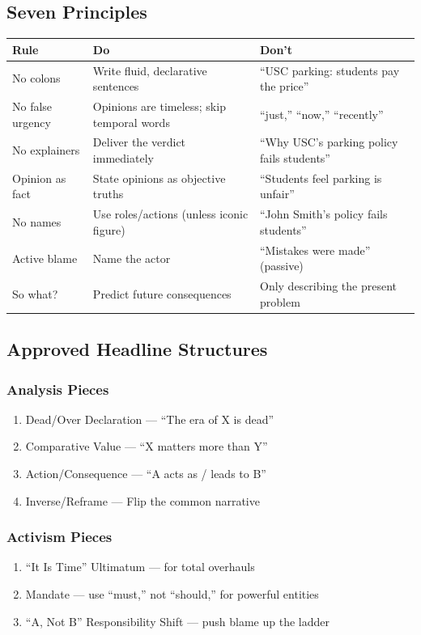 \documentclass[12pt]{article}
\newlength{\tblwidth}
\begin{document}
\subsection{Seven Principles}

\begin{longtable}{p{0.22\tblwidth} p{0.36\tblwidth} p{0.38\tblwidth}}
\toprule
\textbf{Rule} & \textbf{Do} & \textbf{Don't} \\
\midrule
No colons & Write fluid, declarative sentences & ``USC parking: students pay the price'' \\
No false urgency & Opinions are timeless; skip temporal words & ``just,'' ``now,'' ``recently'' \\
No explainers & Deliver the verdict immediately & ``Why USC's parking policy fails students'' \\
Opinion as fact & State opinions as objective truths & ``Students feel parking is unfair'' \\
No names & Use roles/actions (unless iconic figure) & ``John Smith's policy fails students'' \\
Active blame & Name the actor & ``Mistakes were made'' (passive) \\
So what? & Predict future consequences & Only describing the present problem \\
\bottomrule
\end{longtable}

\subsection{Approved Headline Structures}

\subsubsection{Analysis Pieces}
\begin{enumerate}
    \item Dead/Over Declaration --- ``The era of X is dead''
    \item Comparative Value --- ``X matters more than Y''
    \item Action/Consequence --- ``A acts as / leads to B''
    \item Inverse/Reframe --- Flip the common narrative
\end{enumerate}

\subsubsection{Activism Pieces}
\begin{enumerate}
    \item ``It Is Time'' Ultimatum --- for total overhauls
    \item Mandate --- use ``must,'' not ``should,'' for powerful entities
    \item ``A, Not B'' Responsibility Shift --- push blame up the ladder
\end{enumerate}
\end{document}

